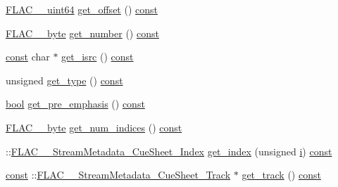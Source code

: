 \begin{DoxyCompactItemize}
\hyperlink{ordinals_8h_aa78c8c70a3eb8a58af7436f278acde8e}{F\+L\+A\+C\+\_\+\+\_\+uint64} \hyperlink{class_f_l_a_c_1_1_metadata_1_1_cue_sheet_1_1_track_a9ef50d7cc6d1b04f6b9fba97c6081a0d}{get\+\_\+offset} () \hyperlink{getopt1_8c_a2c212835823e3c54a8ab6d95c652660e}{const} 
\item 
\hyperlink{ordinals_8h_a5eb569b12d5b047cdacada4d57924ee3}{F\+L\+A\+C\+\_\+\+\_\+byte} \hyperlink{class_f_l_a_c_1_1_metadata_1_1_cue_sheet_1_1_track_a57b27e5e4ffa91fd7295f455181c0f53}{get\+\_\+number} () \hyperlink{getopt1_8c_a2c212835823e3c54a8ab6d95c652660e}{const} 
\item 
\hyperlink{getopt1_8c_a2c212835823e3c54a8ab6d95c652660e}{const} char $\ast$ \hyperlink{class_f_l_a_c_1_1_metadata_1_1_cue_sheet_1_1_track_a4ea0887a1e0c6428184a017f5b80a262}{get\+\_\+isrc} () \hyperlink{getopt1_8c_a2c212835823e3c54a8ab6d95c652660e}{const} 
\item 
unsigned \hyperlink{class_f_l_a_c_1_1_metadata_1_1_cue_sheet_1_1_track_a40db39ab9e06d4ec92f07c43ffc78810}{get\+\_\+type} () \hyperlink{getopt1_8c_a2c212835823e3c54a8ab6d95c652660e}{const} 
\item 
\hyperlink{mac_2config_2i386_2lib-src_2libsoxr_2soxr-config_8h_abb452686968e48b67397da5f97445f5b}{bool} \hyperlink{class_f_l_a_c_1_1_metadata_1_1_cue_sheet_1_1_track_a1b8e3e382cf989900968e5ce7d3e0762}{get\+\_\+pre\+\_\+emphasis} () \hyperlink{getopt1_8c_a2c212835823e3c54a8ab6d95c652660e}{const} 
\item 
\hyperlink{ordinals_8h_a5eb569b12d5b047cdacada4d57924ee3}{F\+L\+A\+C\+\_\+\+\_\+byte} \hyperlink{class_f_l_a_c_1_1_metadata_1_1_cue_sheet_1_1_track_aec12b4f83f590d53f80d4900c54a9ca3}{get\+\_\+num\+\_\+indices} () \hyperlink{getopt1_8c_a2c212835823e3c54a8ab6d95c652660e}{const} 
\item 
\+::\hyperlink{struct_f_l_a_c_____stream_metadata___cue_sheet___index}{F\+L\+A\+C\+\_\+\+\_\+\+Stream\+Metadata\+\_\+\+Cue\+Sheet\+\_\+\+Index} \hyperlink{class_f_l_a_c_1_1_metadata_1_1_cue_sheet_1_1_track_a6e20465d16f5e68829f550ecc3dff031}{get\+\_\+index} (unsigned \hyperlink{checksum_8c_ab80e330a3bc9e38c1297fe17381e92b4}{i}) \hyperlink{getopt1_8c_a2c212835823e3c54a8ab6d95c652660e}{const} 
\item 
\hyperlink{getopt1_8c_a2c212835823e3c54a8ab6d95c652660e}{const} \+::\hyperlink{struct_f_l_a_c_____stream_metadata___cue_sheet___track}{F\+L\+A\+C\+\_\+\+\_\+\+Stream\+Metadata\+\_\+\+Cue\+Sheet\+\_\+\+Track} $\ast$ \hyperlink{class_f_l_a_c_1_1_metadata_1_1_cue_sheet_1_1_track_a4dd8fe7981c91433004dd84df9f3fa73}{get\+\_\+track} () \hyperlink{getopt1_8c_a2c212835823e3c54a8ab6d95c652660e}{const} 

\end{DoxyCompactItemize}

